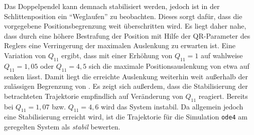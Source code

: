Das Doppelpendel kann demnach stabilisiert werden, jedoch ist in der Schlittenposition ein "`Weglaufen"' zu beobachten. Dieses sorgt dafür, dass die vorgegebene Positionsbegrenzung weit überschritten wird. Es liegt daher nahe, dass durch eine höhere Bestrafung der Position mit Hilfe der QR-Parameter des Reglers eine Verringerung der maximalen Auslenkung zu erwarten ist. Eine Variation von $Q_{11}$ ergibt, dass mit einer Erhöhung von $Q_{11}=1$ auf wahlweise $Q_{11}=1,05$ oder $Q_{11}=4,5$ sich die maximale Positionsauslenkung von etwa  auf  senken lässt. Damit liegt die erreichte Auslenkung weiterhin weit außerhalb der zulässigen Begrenzung von . Es zeigt sich außerdem, dass die Stabilisierung der betrachteten Trajektorie empfindlich auf Veränderung von $Q_{11}$ reagiert. Bereits bei $Q_{11}=1,07$ bzw. $Q_{11}=4,6$ wird das System instabil. Da allgemein jedoch eine Stabilisierung erreicht wird, ist die Trajektorie für die Simulation \texttt{ode4} am geregelten System als \textit{stabil} bewerten. 

